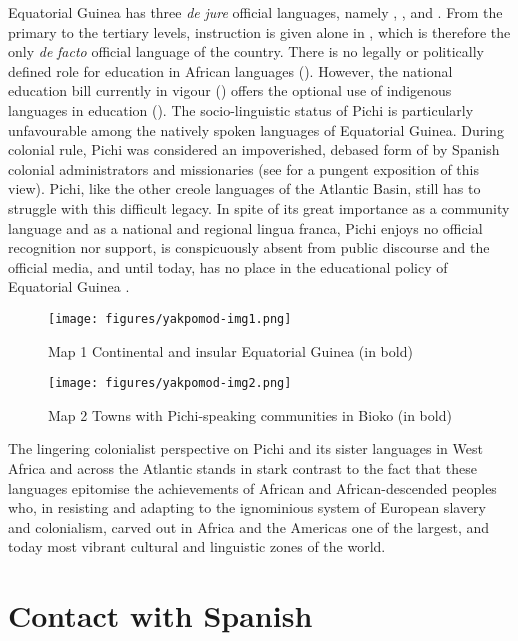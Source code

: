 Equatorial Guinea has three \textit{de} \textit{jure} official languages, namely , , and . From the primary to the tertiary levels, instruction is given alone in , which is therefore the only \textit{de} \textit{facto} official language of the country. There is no legally or politically defined role for education in African languages (\citealt{Yakpo2011,Yakpo2016estatuto}). However, the national education bill currently in vigour (\citealt{RepublicadeGuineaEcuatorial2007}) offers the optional use of indigenous languages in education (\citealt{OloFernandes2012}). The socio-linguistic status of Pichi is particularly unfavourable among the natively spoken languages of Equatorial Guinea. During colonial rule, Pichi was considered an impoverished, debased form of  by Spanish colonial administrators and missionaries (see \citealt[5–7]{Zarco1938} for a pungent exposition of this view). Pichi, like the other creole languages of the Atlantic Basin, still has to struggle with this difficult legacy. In spite of its great importance as a community language and as a national and regional lingua franca, Pichi enjoys no official recognition nor support, is conspicuously absent from public discourse and the official media, and until today, has no place in the educational policy of Equatorial Guinea \citep{Yakpo2016estatuto}.

\begin{figure}
	\caption*{Map 1 Continental and insular Equatorial Guinea (in bold)}
	\texttt{[image: figures/yakpomod-img1.png]}
	\label{map:1:1.1}
\end{figure}

\begin{figure}
	\caption*{Map 2 Towns with Pichi-speaking communities in Bioko (in bold)}
	\texttt{[image: figures/yakpomod-img2.png]}
	\label{map:1:1.2}
\end{figure}

The lingering colonialist perspective on Pichi and its sister languages in West Africa and across the Atlantic stands in stark contrast to the fact that these languages epitomise the achievements of African and African-descended peoples who, in resisting and adapting to the ignominious system of European slavery and colonialism, carved out in Africa and the Americas one of the largest, and today most vibrant cultural and linguistic zones of the world.

\section{Contact with Spanish}\label{sec:1.2}

